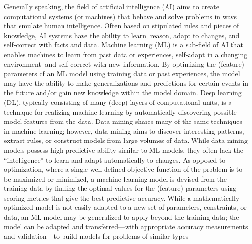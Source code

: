 Generally speaking, the field of artificial intelligence (AI) aims to create computational systems (or machines) that behave and solve problems in ways that emulate human intelligence. Often based on stipulated rules and pieces of knowledge, AI systems have the ability to learn, reason, adapt to changes, and self-correct with facts and data. Machine learning (ML) is a sub-field of AI that enables machines to learn from past data or experiences, self-adapt in a changing environment, and self-correct with new information. By optimizing the (feature) parameters of an ML model using training data or past experiences, the model may have the ability to make generalizations and predictions for certain events in the future and/or gain new knowledge within the model domain. Deep learning (DL), typically consisting of many (deep) layers of computational units, is a technique for realizing machine learning by automatically discovering possible model features from the data. Data mining shares many of the same techniques in machine learning; however, data mining aims to discover interesting patterns, extract rules, or construct models from large volumes of data. While data mining models possess high predictive ability similar to ML models, they often lack the ``intelligence'' to learn and adapt automatically to changes. As opposed to optimization, where a single well-defined objective function of the problem is to be maximized or minimized, a machine-learning model is devised from the training data by finding the optimal values for the (feature) parameters using scoring metrics that give the best predictive accuracy. While a mathematically optimized model is not easily adapted to a new set of parameters, constraints, or data, an ML model may be generalized to apply beyond the training data; the model can be adapted and transferred---with appropriate accuracy measurements and validation---to build models for problems of similar types. 

